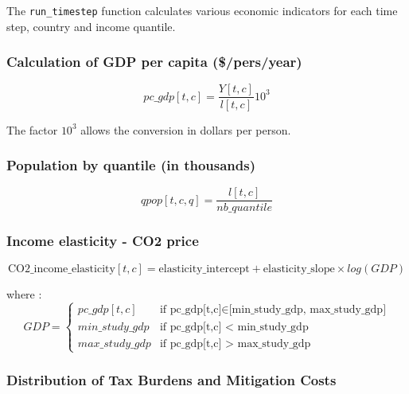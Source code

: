 \documentclass[
]{article}
\begin{document}
The \texttt{run\_timestep} function calculates various economic
indicators for each time step, country and income quantile.

\subsubsection{Calculation of GDP per capita
(\$/pers/year)}\label{calculation-of-gdp-per-capita-pers}

\begin{equation}
 pc\_gdp[t,c] = \frac{Y[t,c]}{l[t,c]} 10^3 
\end{equation}


The factor \(10^3\) allows the conversion in dollars per person.

\subsubsection{Population by quantile (in
thousands)}\label{population-by-quantile-in-thousands}

\begin{equation}
 qpop[t,c,q] = \frac{l[t,c]}{nb\_quantile} 
\end{equation}


\subsubsection{Income elasticity - CO2
price}\label{income-elasticity---co2-price}

\begin{equation}
  \text{CO2\_income\_elasticity}[t,c] = \text{elasticity\_intercept} + \text{elasticity\_slope} \times log(GDP)
\end{equation}


where : 
\begin{equation}
 GDP = 
 \begin{cases}
 pc\_gdp[t,c] & \text{if  pc\_gdp[t,c]} \in \text{[min\_study\_gdp, max\_study\_gdp]} \\
 min\_study\_gdp & \text{if  pc\_gdp[t,c] < min\_study\_gdp} \\
 max\_study\_gdp & \text{if  pc\_gdp[t,c] > max\_study\_gdp}
 \end{cases} 
\end{equation}


\subsubsection{Distribution of Tax Burdens and Mitigation
Costs}\label{distribution-of-tax-burdens-and-mitigation-costs}
\end{document}
